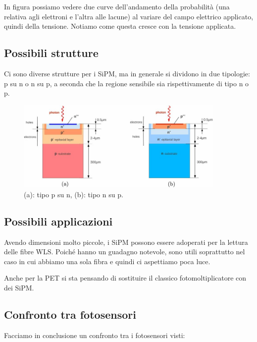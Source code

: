 In figura possiamo vedere due curve dell'andamento della probabilità (una relativa agli elettroni e l'altra alle lacune) al variare del campo elettrico applicato, quindi della tensione. Notiamo come questa cresce con la tensione applicata.

\subsection{Possibili strutture}
Ci sono diverse strutture per i SiPM, ma in generale si dividono in due tipologie: p su n o n su p, a seconda che la regione sensibile sia rispettivamente di tipo n o p.

\begin{figure}[H]
   \centering
   \includegraphics[width=0.9\textwidth]{immagini/strutture_SiPM.png}
   \caption*{(a): tipo p su n, (b): tipo n su p.}
\end{figure}

\subsection{Possibili applicazioni}

Avendo dimensioni molto piccole, i SiPM possono essere adoperati per la lettura delle fibre WLS. Poiché hanno un guadagno notevole, sono utili soprattutto nel caso in cui abbiamo una sola fibra e quindi ci aspettiamo poca luce.

Anche per la PET si sta pensando di sostituire il classico fotomoltiplicatore con dei SiPM.

\subsection{Confronto tra fotosensori}

Facciamo in conclusione un confronto tra i fotosensori visti:

